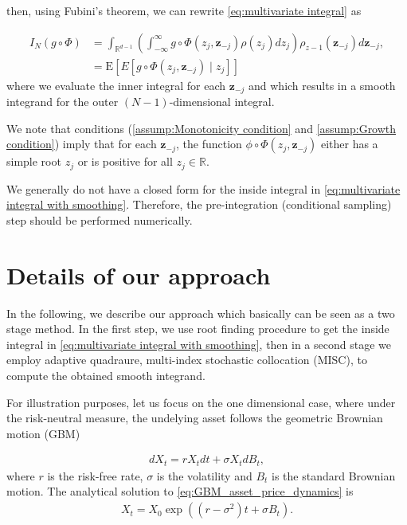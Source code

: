 \documentclass[11pt]{article}
\newcommand{\expt}[1]{\mathrm{E}\left[#1\right]}
\newcommand{\rset}{\mathbb{R}}
\newcommand{\PERIOD}{.}
\newcommand{\COMMA}{,}
\begin{document}
then, using Fubini's theorem,  we can rewrite \eqref{eq:multivariate integral} as

\begin{align}\label{eq:multivariate integral with smoothing}
I_N (g \circ \Phi) &= \int_{\rset^{d-1}} \left(\int_{-\infty}^\infty g \circ\Phi(z_j,\mathbf{z}_{-j}) \rho(z_j) dz_j  \right) \rho_{z-1}(\mathbf{z}_{-j}) d\mathbf{z}_{-j}\COMMA \\ \nonumber	  
&= \expt{E \left[g \circ\Phi(z_j,\mathbf{z}_{-j}) \mid z_j \right]}
\end{align}
where we evaluate the inner integral for each $\mathbf{z}_{-j}$ and which results in a smooth integrand for the outer $(N-1)$-dimensional integral. 

We note that  conditions (\eqref{assump:Monotonicity condition} and \eqref{assump:Growth condition}) imply that for each $\mathbf{z}_{-j}$, the function $\phi \circ \Phi(z_j,\mathbf{z}_{-j})$ either has a simple  root $z_j$ or is positive for all $z_j \in \rset$.

We generally do not have a closed form for the inside integral in \ref{eq:multivariate integral with smoothing}. Therefore, the pre-integration (conditional sampling)  step should be performed numerically.


\section{Details of our approach}\label{sec:Details of our approach}


 In the following, we describe our approach which basically can be seen as a two stage method. In the first step, we use root finding procedure to get the inside integral  in \ref{eq:multivariate integral with smoothing}, then in a second stage we employ adaptive quadraure, multi-index stochastic collocation (MISC), to compute the obtained smooth integrand.


For illustration purposes, let us focus on the one dimensional case, where under the risk-neutral measure, the undelying asset follows the geometric Brownian motion (GBM)

\begin{align}\label{eq:GBM_asset_price_dynamics}
dX_t= r X_t dt+\sigma X_t dB_t \COMMA 
\end{align}
		where $r$ is the risk-free rate, $\sigma$ is the volatility and $B_t$ is the standard Brownian motion. The analytical solution to  \eqref{eq:GBM_asset_price_dynamics} is 
\begin{align}\label{eq:GBM_asset_price_analytic_sol}
	X_t=  X_0 \exp(( r-\sigma^2) t+\sigma B_t) \PERIOD
\end{align}
\end{document}

